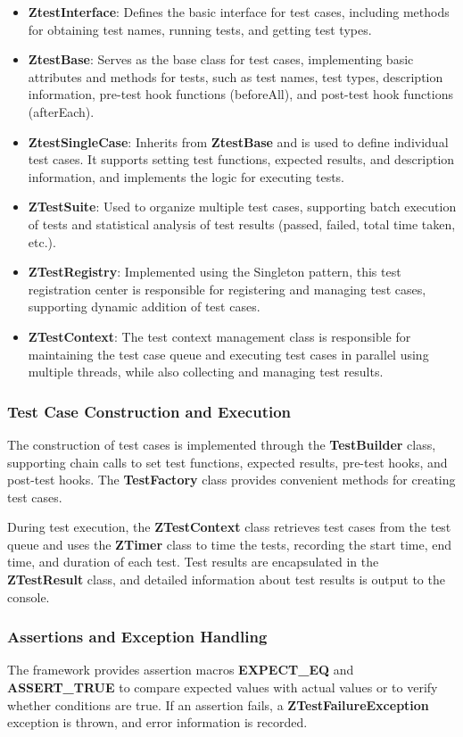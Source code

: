 \documentclass[english]{article}
\begin{document}
\begin{itemize}
    \item \textbf{ZtestInterface}: Defines the basic interface for test cases, including methods for obtaining test names, running tests, and getting test types.
    \item \textbf{ZtestBase}: Serves as the base class for test cases, implementing basic attributes and methods for tests, such as test names, test types, description information, pre-test hook functions (beforeAll), and post-test hook functions (afterEach).
    \item \textbf{ZtestSingleCase}: Inherits from \textbf{ZtestBase} and is used to define individual test cases. It supports setting test functions, expected results, and description information, and implements the logic for executing tests.
    \item \textbf{ZTestSuite}: Used to organize multiple test cases, supporting batch execution of tests and statistical analysis of test results (passed, failed, total time taken, etc.).
    \item \textbf{ZTestRegistry}: Implemented using the Singleton pattern, this test registration center is responsible for registering and managing test cases, supporting dynamic addition of test cases.
    \item \textbf{ZTestContext}: The test context management class is responsible for maintaining the test case queue and executing test cases in parallel using multiple threads, while also collecting and managing test results.
\end{itemize}
\subsubsection{Test Case Construction and Execution}
The construction of test cases is implemented through the \textbf{TestBuilder} class, supporting chain calls to set test functions, expected results, pre-test hooks, and post-test hooks. The \textbf{TestFactory} class provides convenient methods for creating test cases.

During test execution, the \textbf{ZTestContext} class retrieves test cases from the test queue and uses the \textbf{ZTimer} class to time the tests, recording the start time, end time, and duration of each test. Test results are encapsulated in the \textbf{ZTestResult} class, and detailed information about test results is output to the console.

\subsubsection{Assertions and Exception Handling}
The framework provides assertion macros \textbf{EXPECT\_EQ} and \textbf{ASSERT\_TRUE} to compare expected values with actual values or to verify whether conditions are true. If an assertion fails, a \textbf{ZTestFailureException} exception is thrown, and error information is recorded.
\end{document}
